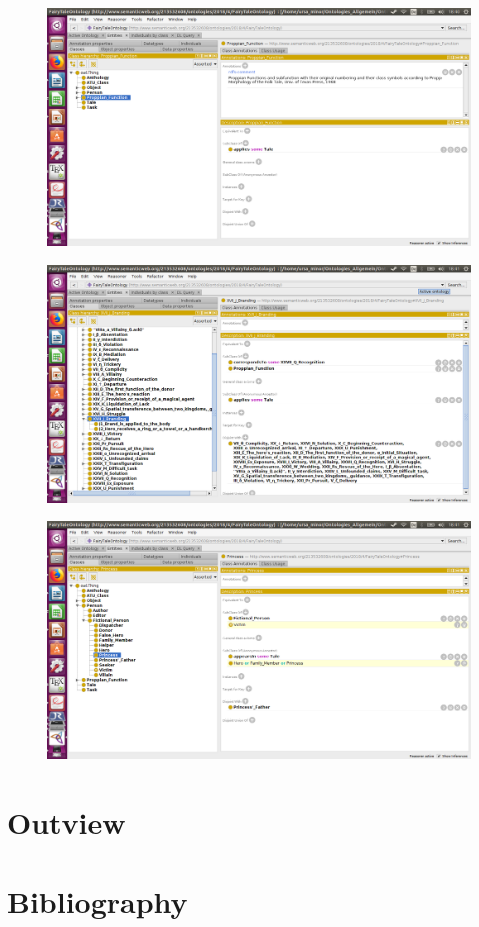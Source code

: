 \documentclass[10pt,a4paper]{article}
\begin{document}
\begin{figure} [H]
 	\includegraphics[scale=0.3]{Screen1.png}
\end{figure}

\begin{figure}[H]
 	\includegraphics[scale=0.3]{Screen2.png}
\end{figure}


\begin{figure}[H]
 	\includegraphics[scale=0.3]{Screen3.png}
\end{figure}





\section{Outview}
\section{Bibliography}
 

\end{document}

